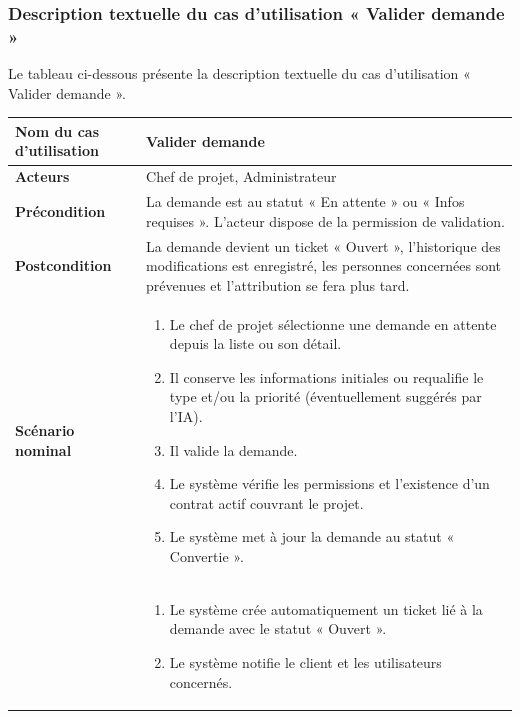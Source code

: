 \subsubsection{Description textuelle du cas d’utilisation « Valider demande »}
Le tableau ci-dessous présente la description textuelle du cas d’utilisation « Valider demande ».

\footnotesize
\renewcommand{\arraystretch}{0.95}
\begin{longtable}{|>{\columncolor{pastelBlue}}p{3.2cm}|p{10.3cm}|}
\hline
\endfirsthead
\hline
\endhead
\hline
\endfoot
\hline
\endlastfoot
\textbf{Nom du cas d'utilisation} & Valider demande \\
\hline
\textbf{Acteurs} & Chef de projet, Administrateur \\
\hline
\textbf{Précondition} & La demande est au statut « En attente » ou « Infos requises ». L'acteur dispose de la permission de validation. \\
\hline
\textbf{Postcondition} &La demande devient un ticket « Ouvert », l'historique des modifications est enregistré, les personnes concernées sont prévenues et l'attribution se fera plus tard. \\
\hline
\textbf{Scénario nominal} &
\begin{enumerate}[label=\arabic*., nosep,leftmargin=0.6cm,topsep=2pt,itemsep=1pt,series=scen_valider]    \item Le chef de projet sélectionne une demande en attente depuis la liste ou son détail.
    \item Il conserve les informations initiales ou requalifie le type et/ou la priorité (éventuellement suggérés par l'IA).
    \item Il valide la demande.
    \item Le système vérifie les permissions et l'existence d'un contrat actif couvrant le projet.
    \item Le système met à jour la demande au statut « Convertie ».
    \end{enumerate} \\ %

 &
\begin{enumerate}[label=\arabic*., nosep,leftmargin=0.6cm,topsep=2pt,itemsep=1pt,resume=scen_valider]
    \item Le système crée automatiquement un ticket lié à la demande avec le statut « Ouvert ».
    \item Le système notifie le client et les utilisateurs concernés.    


\end{enumerate}
\end{longtable}
